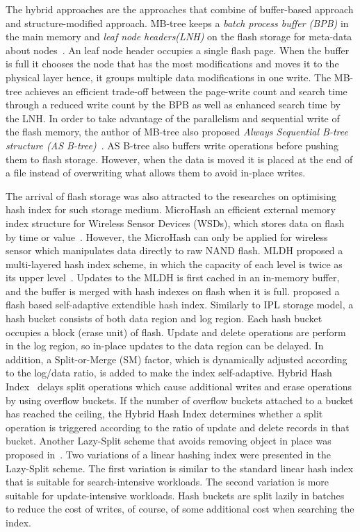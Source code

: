 The hybrid approaches are the approaches that combine of buffer-based approach and structure-modified approach.
MB-tree keeps a \textit{batch process buffer (BPB)} in the main memory and \textit{leaf node headers(LNH)} on the flash storage for meta-data about nodes~\citep{Roh:2009}. 
An leaf node header occupies a single flash page.
When the buffer is full it chooses the node that has the most modifications and moves it to the physical layer hence, it groups multiple data modifications in one write. 
The MB-tree achieves an efficient trade-off between the page-write count and search time through a reduced write count by the BPB as well as enhanced search time by the LNH. 
In order to take advantage of the parallelism and sequential write of the flash memory, the author of MB-tree also proposed \textit{Always Sequential B-tree structure (AS B-tree)}~\citep{Roh:2014}.
AS B-tree also buffers write operations before pushing them to flash storage.
However, when the data is moved it is placed at the end of a file instead of overwriting what allows them to avoid in-place writes. 

The arrival of flash storage was also attracted to the researches on optimising hash index for such storage medium.
MicroHash an efficient external memory index structure for Wireless Sensor Devices (WSDs), which stores data on flash by time or value~\citep{Zeinalipour:2005}. 
However, the MicroHash can only be applied for wireless sensor which manipulates data directly to raw NAND flash.
MLDH proposed a multi-layered hash index scheme, in which the capacity of each level is twice as its upper level~\citep{Yang:2009}. 
Updates to the MLDH is first cached in an in-memory buffer, and the buffer is merged with hash indexes on flash when it is full.
\cite{Wang:2010} proposed a flash based self-adaptive extendible hash index.
Similarly to IPL storage model, a hash bucket consists of both data region and log region.
Each hash bucket occupies a block (erase unit) of flash. 
Update and delete operations are perform in the log region, so in-place updates to the data region can be delayed.
In addition, a Split-or-Merge (SM) factor, which is dynamically adjusted according to the log/data ratio, is added to make the index self-adaptive.
Hybrid Hash Index~\citep{Yoo:2012} delays split operations which cause additional writes and erase operations by using overflow buckets.
If the number of overflow buckets attached to a bucket has reached the ceiling, the Hybrid Hash Index determines whether a split operation is triggered according to the ratio of update and delete records in that bucket.
Another Lazy-Split scheme that avoids removing object in place was proposed in~\citep{Li:2008}. 
Two variations of a linear hashing index were presented in the Lazy-Split scheme. 
The first variation is similar to the standard linear hash index that is suitable for search-intensive workloads.
The second variation is more suitable for update-intensive workloads.
Hash buckets are split lazily in batches to reduce the cost of writes, of course, of some additional cost when searching the index.

